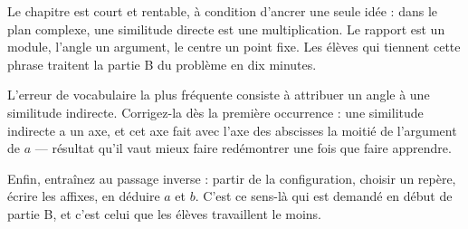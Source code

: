 \begin{notepourlaclasse}
Le chapitre est court et rentable, à condition d'ancrer une seule idée : dans
le plan complexe, une similitude directe est une multiplication. Le rapport
est un module, l'angle un argument, le centre un point fixe. Les élèves qui
tiennent cette phrase traitent la partie B du problème en dix minutes.

L'erreur de vocabulaire la plus fréquente consiste à attribuer un angle à une
similitude indirecte. Corrigez-la dès la première occurrence : une similitude
indirecte a un axe, et cet axe fait avec l'axe des abscisses la moitié de
l'argument de $a$ — résultat qu'il vaut mieux faire redémontrer une fois que
faire apprendre.

Enfin, entraînez au passage inverse : partir de la configuration, choisir un
repère, écrire les affixes, en déduire $a$ et $b$. C'est ce sens-là qui est
demandé en début de partie B, et c'est celui que les élèves travaillent le
moins.
\end{notepourlaclasse}

